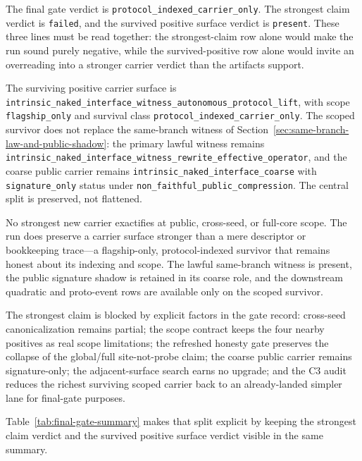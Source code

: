 \documentclass[11pt]{article}
\theoremstyle{definition}
\begin{document}
The final gate verdict is \texttt{protocol\_indexed\_carrier\_only}. The strongest
claim verdict is \texttt{failed}, and the survived positive surface verdict is
\texttt{present}. These three lines must be read together: the strongest-claim row
alone would make the run sound purely negative, while the survived-positive row alone
would invite an overreading into a stronger carrier verdict than the artifacts
support.

The surviving positive carrier surface is
\nolinkurl{intrinsic_naked_interface_witness_autonomous_protocol_lift}, with scope
\texttt{flagship\_only} and survival class \texttt{protocol\_indexed\_carrier\_only}.
The scoped survivor does not replace the same-branch witness of
Section~\ref{sec:same-branch-law-and-public-shadow}: the primary lawful witness
remains \nolinkurl{intrinsic_naked_interface_witness_rewrite_effective_operator}, and
the coarse public carrier remains \nolinkurl{intrinsic_naked_interface_coarse} with
\texttt{signature\_only} status under \texttt{non\_faithful\_public\_compression}. The
central split is preserved, not flattened.

No strongest new carrier exactifies at public, cross-seed, or full-core scope. The run
does preserve a carrier surface stronger than a mere descriptor or bookkeeping
trace---a flagship-only, protocol-indexed survivor that remains honest about its
indexing and scope. The lawful same-branch witness is present, the public signature
shadow is retained in its coarse role, and the downstream quadratic and proto-event
rows are available only on the scoped survivor.

The strongest claim is blocked by explicit factors in the gate record: cross-seed
canonicalization remains partial; the scope contract keeps the four nearby positives
as real scope limitations; the refreshed honesty gate preserves the collapse of the
global/full site-not-probe claim; the coarse public carrier remains signature-only;
the adjacent-surface search earns no upgrade; and the C3 audit reduces the richest
surviving scoped carrier back to an already-landed simpler lane for final-gate
purposes.

Table~\ref{tab:final-gate-summary} makes that split explicit by keeping the strongest
claim verdict and the survived positive surface verdict visible in the same summary.
\end{document}
